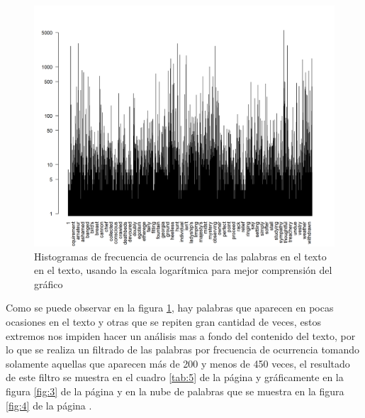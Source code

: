 \documentclass{article}
\begin{document}
\begin{center}
\begin{figure}
\includegraphics[scale=0.65]{figuras/frecuenciapalabra.png}
\caption{Histogramas de frecuencia de ocurrencia de las palabras en el texto en el texto, usando la escala logarítmica para mejor comprensión del gráfico}
\label{fig:2}
\end{figure}
\end{center}
 
Como se puede observar en la figura \ref{fig:2}, hay palabras que aparecen en pocas ocasiones en el texto y otras que se repiten gran cantidad de veces, estos extremos nos impiden hacer un análisis mas a fondo del contenido del texto, por lo que se realiza un filtrado de las palabras por frecuencia de ocurrencia tomando solamente aquellas que aparecen más de 200 y menos de 450 veces, el resultado de este filtro se muestra en el cuadro \ref{tab:5} de la página \pageref{tab:5} y gráficamente en la figura \ref{fig:3} de la página \pageref{fig:3} y en la nube de palabras que se muestra en la figura \ref{fig:4} de la página \pageref{fig:4}.
\end{document}
